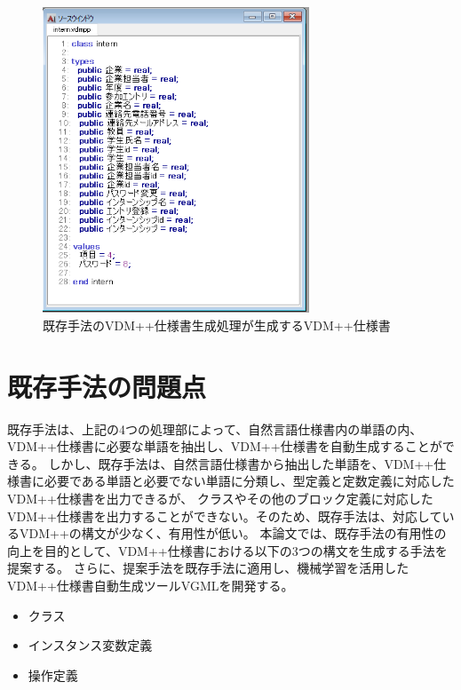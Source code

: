 \begin{figure}[tp]
    \begin{center}
        \includegraphics[width=300]{image/exis_vdm.png}
        \caption{既存手法のVDM++仕様書生成処理が生成するVDM++仕様書}
        \label{fig:exis_vdm}
    \end{center}
\end{figure}

\section{既存手法の問題点}
\label{sec:problem}
既存手法は、上記の4つの処理部によって、自然言語仕様書内の単語の内、VDM++仕様書に必要な単語を抽出し、VDM++仕様書を自動生成することができる。
しかし、既存手法は、自然言語仕様書から抽出した単語を、VDM++仕様書に必要である単語と必要でない単語に分類し、型定義と定数定義に対応したVDM++仕様書を出力できるが、
クラスやその他のブロック定義に対応したVDM++仕様書を出力することができない。そのため、既存手法は、対応しているVDM++の構文が少なく、有用性が低い。
本論文では、既存手法の有用性の向上を目的として、VDM++仕様書における以下の3つの構文を生成する手法を提案する。
さらに、提案手法を既存手法に適用し、機械学習を活用したVDM++仕様書自動生成ツールVGMLを開発する。

\begin{itemize}
    \item クラス
    \item インスタンス変数定義
    \item 操作定義
\end{itemize}